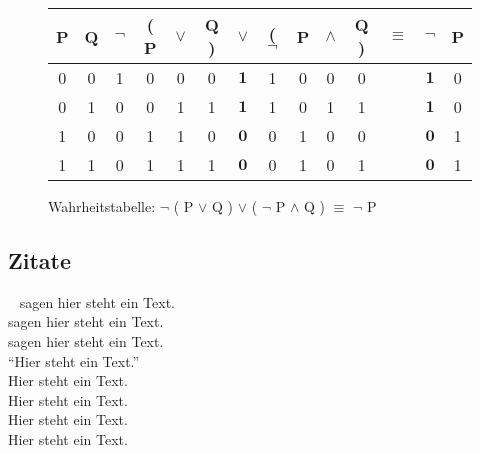 \begin{figure}[!ht]
    \begin{center}
        \begin{tabular}{|c|c||c|c|c|c|c|c|c|c|c||c||c|c|}
            \hline
            P & Q & $\neg$ & ( P & $\vee$ & Q ) & $\vee$       & ( $\neg$ & P & $\wedge$ & Q ) & $\equiv$ & $\neg$       & P \\ \hline \hline
            0 & 0 & 1      & 0   & 0      & 0   & $\mathbf{1}$ & 1        & 0 & 0        & 0   &          & $\mathbf{1}$ & 0 \\ \hline
            0 & 1 & 0      & 0   & 1      & 1   & $\mathbf{1}$ & 1        & 0 & 1        & 1   &          & $\mathbf{1}$ & 0 \\ \hline
            1 & 0 & 0      & 1   & 1      & 0   & $\mathbf{0}$ & 0        & 1 & 0        & 0   &          & $\mathbf{0}$ & 1 \\ \hline
            1 & 1 & 0      & 1   & 1      & 1   & $\mathbf{0}$ & 0        & 1 & 0        & 1   &          & $\mathbf{0}$ & 1 \\ \hline
        \end{tabular}
        \caption{Wahrheitstabelle: $\neg$ ( P $\vee$ Q ) $\vee$ ( $\neg$ P $\wedge$ Q ) $\equiv$ $\neg$ P}\label{fig:figureFormulaTable}
    \end{center}
\end{figure}


\subsection{Zitate}\label{subsec:zitate}~\cite{Bartels2008} sagen hier steht ein Text. \\
\textcite{Bruno2009} sagen hier steht ein Text. \\
\textcite*{Bruno2009} sagen hier steht ein Text. \\
"`Hier steht ein Text."'~\autocite{Bartels2008} \\
Hier steht ein Text.~\autocite[Vgl.][]{Bartels2008} \\
Hier steht ein Text.~\autocite[][S. 200]{Bruno2009} \\
Hier steht ein Text.~\autocite*[][S. 200]{Bruno2009} \\
Hier steht ein Text.~\autocite{Wikipedia2011,Bruno2009} \\

